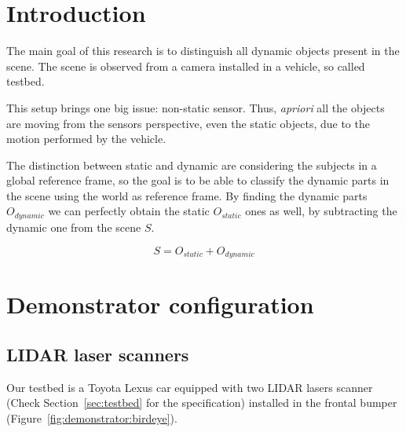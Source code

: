 
\section{Introduction}

The main goal of this research is to distinguish all dynamic objects present in the scene. The scene is observed from a camera installed in a vehicle, so called testbed.

This setup brings one big issue: non-static sensor. Thus, \textit{apriori} all the objects are moving from the sensors perspective, even the static objects, due to the motion performed by the vehicle.

The distinction between static and dynamic are considering the subjects in a global reference frame, so the goal is to be able to classify the dynamic parts in the scene using the world as reference frame. By finding the dynamic parts $O_{dynamic}$ we can perfectly obtain the static $O_{static}$ ones as well, by subtracting the dynamic one from the scene $S$.

\begin{equation}
S=O_{static}+O_{dynamic}
\end{equation}

\section{Demonstrator configuration} %
\label{sec:demonstrator}

\subsection{LIDAR laser scanners}

Our testbed is a Toyota Lexus car equipped with two LIDAR lasers scanner (Check Section~\ref{sec:testbed} for the specification) installed in the frontal bumper (Figure~\ref{fig:demonstrator:birdeye}).

